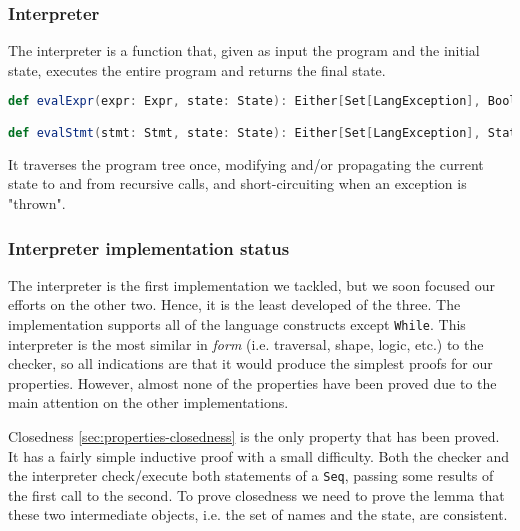 \subsubsection{Interpreter}

The interpreter is a function that, given as input the program and the initial state, executes the entire program and returns the final state.

\begin{lstlisting}[language=Scala,frame=none,escapechar=*,basicstyle=\tt\scriptsize]
def evalExpr(expr: Expr, state: State): Either[Set[LangException], Boolean]

def evalStmt(stmt: Stmt, state: State): Either[Set[LangException], State]
\end{lstlisting}

It traverses the program tree once, modifying and/or propagating the current state to and from recursive calls, and short-circuiting when an exception is "thrown".

\subsubsection{Interpreter implementation status}

The interpreter is the first implementation we tackled, but we soon focused our efforts on the other two. Hence, it is the least developed of the three. The implementation supports all of the language constructs except \texttt{While}. This interpreter is the most similar in \textit{form} (i.e. traversal, shape, logic, etc.) to the checker, so all indications are that it would produce the simplest proofs for our properties. However, almost none of the properties have been proved due to the main attention on the other implementations.

Closedness \ref{sec:properties-closedness} is the only property that has been proved. It has a fairly simple inductive proof with a small difficulty. Both the checker and the interpreter check/execute both statements of a \texttt{Seq}, passing some results of the first call to the second. To prove closedness we need to prove the lemma that these two intermediate objects, i.e. the set of names and the state, are consistent.

